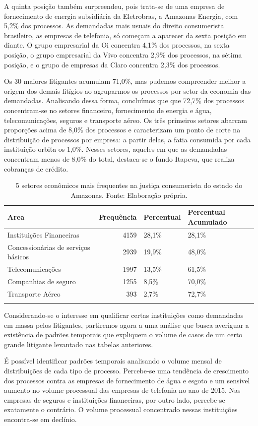 \documentclass[]{report}
\begin{document}
A quinta posição também surpreendeu, pois trata-se de uma empresa de
fornecimento de energia subsidiária da Eletrobras, a Amazonas Energia,
com 5,2\% dos processos. As demandadas mais usuais do direito
consumerista brasileiro, as empresas de telefonia, só começam a aparecer
da sexta posição em diante. O grupo empresarial da Oi concentra 4,1\%
dos processos, na sexta posição, o grupo empresarial da Vivo concentra
2,9\% dos processos, na sétima posição, e o grupo de empresas da Claro
concentra 2,3\% dos processos.

Os 30 maiores litigantes acumulam 71,0\%, mas pudemos compreender melhor
a origem dos demais litígios ao agruparmos os processos por setor da
economia das demandadas. Analisando dessa forma, concluímos que que
72,7\% dos processos concentram-se no setores financeiro, fornecimento
de energia e água, telecomunicações, seguros e transporte aéreo. Os três
primeiros setores abarcam proporções acima de 8,0\% dos processos e
caracterizam um ponto de corte na distribuição de processos por empresa:
a partir delas, a fatia consumida por cada instituição orbita os 1,0\%.
Nesses setores, aqueles em que as demandadas concentram menos de 8,0\%
do total, destaca-se o fundo Itapeva, que realiza cobranças de crédito.

\begin{longtable}{lrll}
\caption{5 setores econômicos mais frequentes na justiça consumerista do estado do Amazonas. Fonte: Elaboração própria.} \\
  \hline
Area & Frequência & Percentual & Percentual Acumulado \\
  \hline
Instituições
Financeiras & 4159 & 28,1\% & 28,1\% \\
  Concessionárias
de serviços
básicos & 2939 & 19,9\% & 48,0\% \\
  Telecomunicações & 1997 & 13,5\% & 61,5\% \\
  Companhias de
seguro & 1255 & 8,5\% & 70,0\% \\
  Transporte
Aéreo & 393 & 2,7\% & 72,7\% \\
   \hline
\hline
\label{unnamed-chunk-78}
\end{longtable}

Considerando-se o interesse em qualificar certas instituições como
demandadas em massa pelos litigantes, partiremos agora a uma análise que
busca averiguar a existência de padrões temporais que expliquem o volume
de casos de um certo grande litigante levantado nas tabelas anteriores.

É possível identificar padrões temporais analisando o volume mensal de
distribuições de cada tipo de processo. Percebe-se uma tendência de
crescimento dos processos contra as empresas de fornecimento de água e
esgoto e um sensível aumento no volume processual das empresas de
telefonia no ano de 2015. Nas empresas de seguros e instituições
financeiras, por outro lado, percebe-se exatamente o contrário. O volume
processual concentrado nessas instituições encontra-se em declínio.
\end{document}
